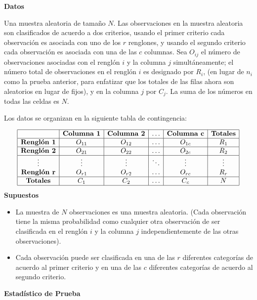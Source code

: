 \documentclass[a4paper,oneside,openany]{book}
\begin{document}
\textbf{Datos}

Una muestra aleatoria de tamaño \(N\). Las observaciones en la muestra
aleatoria son clasificados de acuerdo a dos criterios, usando el primer
criterio cada observación es asociada con uno de los \(r\) renglones, y
usando el segundo criterio cada observación es asociada con una de las
\(c\) columnas. Sea \(O_{ij}\) el número de observaciones asociadas con
el renglón \(i\) y la columna \(j\) simultáneamente; el número total de
observaciones en el renglón \(i\) es designado por \(R_{i}\), (en lugar
de \(n_{i}\) como la prueba anterior, para enfatizar que los totales de
las filas ahora son aleatorios en lugar de fijos), y en la columna \(j\)
por \(C_{j}\). La suma de los números en todas las celdas es \(N\).

Los datos se organizan en la siguiente tabla de contingencia:

\[
\begin{equation*}
\begin{array}{|c|c|c|c|c|c|} 
\hline
&\textbf{Columna 1} &\textbf{Columna 2} &\ldots&\textbf{Columna c}&\textbf{Totales}\\
\hline
\textbf{Renglón 1} &O_{11} &O_{12} &\ldots&O_{1c}&R_1\\
\hline
\textbf{Renglón 2} &O_{21} &O_{22} &\ldots&O_{2c}&R_2\\
\hline
\vdots& \vdots& \vdots& \ddots&\vdots& \vdots\\
\textbf{Renglón r}&O_{r1} &O_{r2} &\ldots&O_{rc}&R_r\\
\hline
\textbf{Totales}&C_1&C_2&\ldots&C_c&N\\
\hline
\end {array}
\end{equation*}
\] \textbf{Supuestos}

\begin{itemize}
\item
  La muestra de \(N\) observaciones es una muestra aleatoria. (Cada
  observación tiene la misma probabilidad como cualquier otra
  observación de ser clasificada en el renglón \(i\) y la columna \(j\)
  independientemente de las otras observaciones).
\item
  Cada observación puede ser clasificada en una de las \(r\) diferentes
  categorías de acuerdo al primer criterio y en una de las \(c\)
  diferentes categorías de acuerdo al segundo criterio.
\end{itemize}

\textbf{Estadístico de Prueba}
\end{document}
